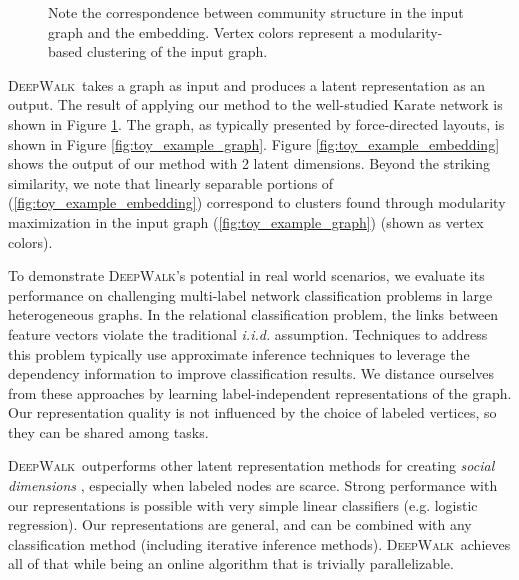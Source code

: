 \documentclass{sig-alternate}
\newcommand{\ouralgorithm}{\textsc{DeepWalk}}
\begin{document}
\begin{figure}[t!]
{		Note the correspondence between community structure in the input graph and the embedding. Vertex colors represent a modularity-based clustering of the input graph.
        }
        \label{fig:toy_example}
\end{figure}

\ouralgorithm\ takes a graph as input and produces a latent representation as an output.
The result of applying our method to the well-studied Karate network is shown in Figure \ref{fig:toy_example}.  
The graph, as typically presented by force-directed layouts, is shown in Figure \ref{fig:toy_example_graph}.
Figure \ref{fig:toy_example_embedding} shows the output of our method with 2 latent dimensions.
Beyond the striking similarity, we note that linearly separable portions of (\ref{fig:toy_example_embedding}) correspond to clusters found through modularity maximization in the input graph (\ref{fig:toy_example_graph}) (shown as vertex colors).

To demonstrate \ouralgorithm's potential in real world scenarios, we evaluate its performance on challenging multi-label network classification problems in large heterogeneous graphs.
In the relational classification problem, the links between feature vectors violate the traditional \emph{i.i.d.} assumption.  
Techniques to address this problem typically use approximate inference techniques \cite{neville2000iterative,Pearl:1988:PRI:534975} to leverage the dependency information to improve classification results.
We distance ourselves from these approaches by learning label-independent representations of the graph.
Our representation quality is not influenced by the choice of labeled vertices, so they can be shared among tasks.


\ouralgorithm\ outperforms other latent representation methods for creating \emph{social dimensions} \cite{Tang:2009:RLV:1557019.1557109,Tang:2011:Leveraging}, especially when labeled nodes are scarce.
Strong performance with our representations is possible with very simple linear classifiers (e.g. logistic regression).
Our representations are general, and can be combined with any classification method (including iterative inference methods).
\ouralgorithm\ achieves all of that while being an online algorithm that is trivially parallelizable.
\end{document}
